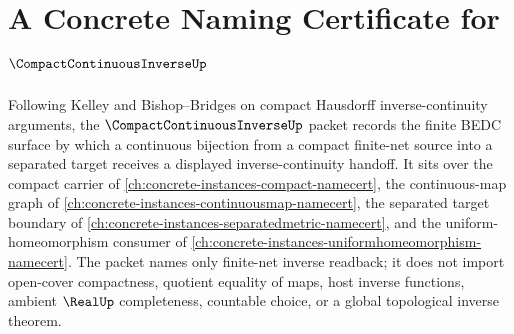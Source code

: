 \chapter{A Concrete Naming Certificate for $\CompactContinuousInverseUp$}
\label{ch:concrete-instances-compact-continuous-inverse-namecert}

Following Kelley and Bishop--Bridges on compact Hausdorff inverse-continuity arguments, the $\CompactContinuousInverseUp$ packet records the finite BEDC surface by which a continuous bijection from a compact finite-net source into a separated target receives a displayed inverse-continuity handoff. It sits over the compact carrier of \autoref{ch:concrete-instances-compact-namecert}, the continuous-map graph of \autoref{ch:concrete-instances-continuousmap-namecert}, the separated target boundary of \autoref{ch:concrete-instances-separatedmetric-namecert}, and the uniform-homeomorphism consumer of \autoref{ch:concrete-instances-uniformhomeomorphism-namecert}. The packet names only finite-net inverse readback; it does not import open-cover compactness, quotient equality of maps, host inverse functions, ambient $\RealUp$ completeness, countable choice, or a global topological inverse theorem.


